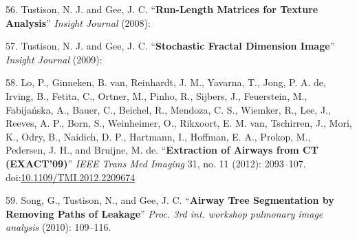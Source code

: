 \documentclass[11pt,]{article}
\begin{document}
56. Tustison, N. J. and Gee, J. C. ``\textbf{Run-Length Matrices for
Texture Analysis}'' \emph{Insight Journal} (2008):

57. Tustison, N. J. and Gee, J. C. ``\textbf{Stochastic Fractal
Dimension Image}'' \emph{Insight Journal} (2009):

58. Lo, P., Ginneken, B. van, Reinhardt, J. M., Yavarna, T., Jong, P. A.
de, Irving, B., Fetita, C., Ortner, M., Pinho, R., Sijbers, J.,
Feuerstein, M., Fabija{ń}ska, A., Bauer, C., Beichel, R., Mendoza, C.
S., Wiemker, R., Lee, J., Reeves, A. P., Born, S., Weinheimer, O.,
Rikxoort, E. M. van, Tschirren, J., Mori, K., Odry, B., Naidich, D. P.,
Hartmann, I., Hoffman, E. A., Prokop, M., Pedersen, J. H., and Bruijne,
M. de. ``\textbf{Extraction of Airways from CT (EXACT'09)}'' \emph{IEEE
Trans Med Imaging} 31, no. 11 (2012): 2093--107.
doi:\href{http://dx.doi.org/10.1109/TMI.2012.2209674}{10.1109/TMI.2012.2209674}

59. Song, G., Tustison, N., and Gee, J. C. ``\textbf{Airway Tree
Segmentation by Removing Paths of Leakage}'' \emph{Proc. 3rd int.
workshop pulmonary image analysis} (2010): 109--116.
\end{document}
